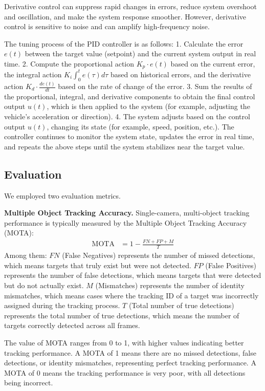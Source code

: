 Derivative control can suppress rapid changes in errors, reduce system overshoot and oscillation, and make the system response smoother. 
However, derivative control is sensitive to noise and can amplify high-frequency noise.


The tuning process of the PID controller is as follows:  
1. Calculate the error $e(t)$ between the target value (setpoint) and the current system output in real time.  
2. Compute the proportional action $K_{p} \cdot e(t)$ based on the current error, the integral action $K_{i} \int_{0}^{t} e(\tau) d \tau$ based on historical errors, and the derivative action $K_{d} \cdot \frac{d e(t)}{d t}$ based on the rate of change of the error.  
3. Sum the results of the proportional, integral, and derivative components to obtain the final control output $u(t)$, which is then applied to the system (for example, adjusting the vehicle's acceleration or direction). 
4. The system adjusts based on the control output $u(t)$, changing its state (for example, speed, position, etc.). 
The controller continues to monitor the system state, updates the error in real time, and repeats the above steps until the system stabilizes near the target value.


\subsection{Evaluation}

We employed two evaluation metrics.

\textbf{Multiple Object Tracking Accuracy.}
Single-camera, multi-object tracking performance is typically measured by the Multiple Object Tracking Accuracy (MOTA):
\begin{align}
	\mathrm{MOTA} & = 1-\frac{F N+F P+M}{T}
\end{align}
Among them:
$FN$ (False Negatives) represents the number of missed detections, which means targets that truly exist but were not detected.
$FP$ (False Positives) represents the number of false detections, which means targets that were detected but do not actually exist.
$M$ (Mismatches) represents the number of identity mismatches, which means cases where the tracking ID of a target was incorrectly assigned during the tracking process.
$T$ (Total number of true detections) represents the total number of true detections, which means the number of targets correctly detected across all frames.

The value of MOTA ranges from 0 to 1, with higher values indicating better tracking performance. 
A MOTA of 1 means there are no missed detections, false detections, or identity mismatches, representing perfect tracking performance. 
A MOTA of 0 means the tracking performance is very poor, with all detections being incorrect.

